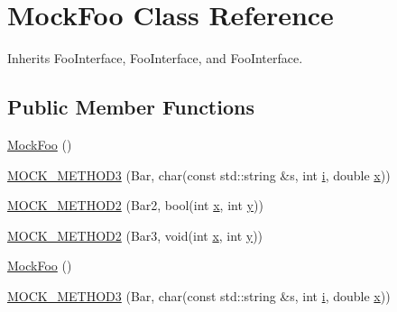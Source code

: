 \hypertarget{class_mock_foo}{}\section{Mock\+Foo Class Reference}
\label{class_mock_foo}


Inherits Foo\+Interface, Foo\+Interface, and Foo\+Interface.

\subsection*{Public Member Functions}
\begin{DoxyCompactItemize}
\item 
\mbox{\hyperlink{class_mock_foo_a2821e632963d0ea4af66a7ce7ed36a8f}{Mock\+Foo}} ()
\item 
\mbox{\hyperlink{class_mock_foo_a8f323a65afd93c0605a02b278b101d18}{M\+O\+C\+K\+\_\+\+M\+E\+T\+H\+O\+D3}} (Bar, char(const std\+::string \&s, int \mbox{\hyperlink{_obj__test_2lib_2googletest-master_2googlemock_2test_2gmock-matchers__test_8cc_acb559820d9ca11295b4500f179ef6392}{i}}, double \mbox{\hyperlink{_obj__test_2lib_2googletest-master_2googlemock_2test_2gmock-matchers__test_8cc_a6150e0515f7202e2fb518f7206ed97dc}{x}}))
\item 
\mbox{\hyperlink{class_mock_foo_ae1d53263d5efcf38fda3990302fac6ab}{M\+O\+C\+K\+\_\+\+M\+E\+T\+H\+O\+D2}} (Bar2, bool(int \mbox{\hyperlink{_obj__test_2lib_2googletest-master_2googlemock_2test_2gmock-matchers__test_8cc_a6150e0515f7202e2fb518f7206ed97dc}{x}}, int \mbox{\hyperlink{_obj__test_2lib_2googletest-master_2googlemock_2test_2gmock-matchers__test_8cc_a39cb44155237f0205e0feb931d5acbed}{y}}))
\item 
\mbox{\hyperlink{class_mock_foo_af1e0c374cadacdaa7ca69f9c38d85543}{M\+O\+C\+K\+\_\+\+M\+E\+T\+H\+O\+D2}} (Bar3, void(int \mbox{\hyperlink{_obj__test_2lib_2googletest-master_2googlemock_2test_2gmock-matchers__test_8cc_a6150e0515f7202e2fb518f7206ed97dc}{x}}, int \mbox{\hyperlink{_obj__test_2lib_2googletest-master_2googlemock_2test_2gmock-matchers__test_8cc_a39cb44155237f0205e0feb931d5acbed}{y}}))
\item 
\mbox{\hyperlink{class_mock_foo_a2821e632963d0ea4af66a7ce7ed36a8f}{Mock\+Foo}} ()
\item 
\mbox{\hyperlink{class_mock_foo_a8f323a65afd93c0605a02b278b101d18}{M\+O\+C\+K\+\_\+\+M\+E\+T\+H\+O\+D3}} (Bar, char(const std\+::string \&s, int \mbox{\hyperlink{_obj__test_2lib_2googletest-master_2googlemock_2test_2gmock-matchers__test_8cc_acb559820d9ca11295b4500f179ef6392}{i}}, double \mbox{\hyperlink{_obj__test_2lib_2googletest-master_2googlemock_2test_2gmock-matchers__test_8cc_a6150e0515f7202e2fb518f7206ed97dc}{x}}))

\end{DoxyCompactItemize}
